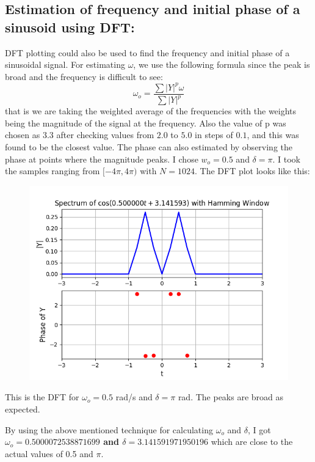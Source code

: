 \documentclass[12pt, a4paper]{article}
\begin{document}
\subsection{Estimation of frequency and initial phase of a sinusoid using DFT:}
DFT plotting could also be used to find the frequency and initial phase of a sinusoidal signal. For estimating $\omega$, we use the following formula since the peak is broad and the frequency is difficult to see:
\begin{equation*}
    \omega_{o} = \frac{\sum |Y|^{p}\omega}{\sum |Y|^{p}}
\end{equation*}
that is we are taking the weighted average of the frequencies with the weights being the magnitude of the signal at the frequency. Also the value of p was chosen as $3.3$ after checking values from $2.0$ to $5.0$ in steps of $0.1$, and this was found to be the closest value. The phase can also estimated by observing the phase at points where the magnitude peaks.
I chose $w_{o} = 0.5$ and $\delta = \pi$. I took the samples ranging from $[-4\pi,4\pi)$ with $N=1024$. The DFT plot looks like this:
\begin{figure}[H]
    \centering
    \includegraphics[scale = 0.8]{Figure_11.png}
    \label{fig:sample}
\end{figure}
\begin{center}
    This is the DFT for $\omega_{o} = 0.5$ rad/s and $\delta = \pi$ rad. The peaks are broad as expected.
\end{center}
By using the above mentioned technique for calculating $\omega_{o}$ and $\delta$, I got \textbf{$\omega_{o} = 0.5000072538871699$ and $\delta = 3.141591971950196$} which are close to the actual values of 0.5 and $\pi$.
\end{document}
